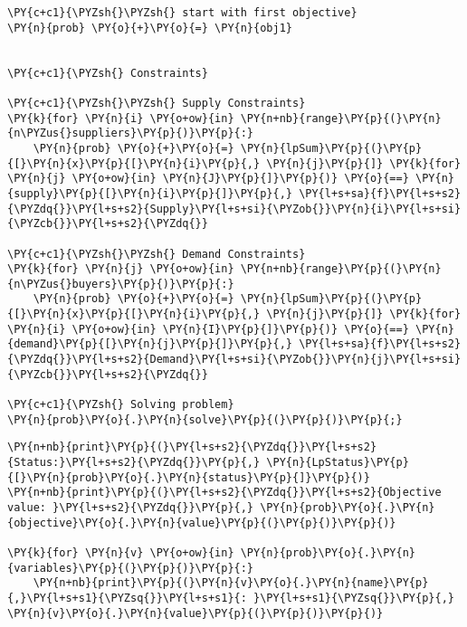 \begin{tcolorbox}[breakable, size=fbox, boxrule=1pt, pad at break*=1mm,colback=cellbackground, colframe=cellborder]
\begin{Verbatim}[commandchars=\\\{\}]
\PY{c+c1}{\PYZsh{}\PYZsh{} start with first objective}
\PY{n}{prob} \PY{o}{+}\PY{o}{=} \PY{n}{obj1}


\PY{c+c1}{\PYZsh{} Constraints}

\PY{c+c1}{\PYZsh{}\PYZsh{} Supply Constraints}
\PY{k}{for} \PY{n}{i} \PY{o+ow}{in} \PY{n+nb}{range}\PY{p}{(}\PY{n}{n\PYZus{}suppliers}\PY{p}{)}\PY{p}{:}
    \PY{n}{prob} \PY{o}{+}\PY{o}{=} \PY{n}{lpSum}\PY{p}{(}\PY{p}{[}\PY{n}{x}\PY{p}{[}\PY{n}{i}\PY{p}{,} \PY{n}{j}\PY{p}{]} \PY{k}{for} \PY{n}{j} \PY{o+ow}{in} \PY{n}{J}\PY{p}{]}\PY{p}{)} \PY{o}{==} \PY{n}{supply}\PY{p}{[}\PY{n}{i}\PY{p}{]}\PY{p}{,} \PY{l+s+sa}{f}\PY{l+s+s2}{\PYZdq{}}\PY{l+s+s2}{Supply}\PY{l+s+si}{\PYZob{}}\PY{n}{i}\PY{l+s+si}{\PYZcb{}}\PY{l+s+s2}{\PYZdq{}}
    
\PY{c+c1}{\PYZsh{}\PYZsh{} Demand Constraints}
\PY{k}{for} \PY{n}{j} \PY{o+ow}{in} \PY{n+nb}{range}\PY{p}{(}\PY{n}{n\PYZus{}buyers}\PY{p}{)}\PY{p}{:}
    \PY{n}{prob} \PY{o}{+}\PY{o}{=} \PY{n}{lpSum}\PY{p}{(}\PY{p}{[}\PY{n}{x}\PY{p}{[}\PY{n}{i}\PY{p}{,} \PY{n}{j}\PY{p}{]} \PY{k}{for} \PY{n}{i} \PY{o+ow}{in} \PY{n}{I}\PY{p}{]}\PY{p}{)} \PY{o}{==} \PY{n}{demand}\PY{p}{[}\PY{n}{j}\PY{p}{]}\PY{p}{,} \PY{l+s+sa}{f}\PY{l+s+s2}{\PYZdq{}}\PY{l+s+s2}{Demand}\PY{l+s+si}{\PYZob{}}\PY{n}{j}\PY{l+s+si}{\PYZcb{}}\PY{l+s+s2}{\PYZdq{}}
    
\PY{c+c1}{\PYZsh{} Solving problem}
\PY{n}{prob}\PY{o}{.}\PY{n}{solve}\PY{p}{(}\PY{p}{)}\PY{p}{;}
\end{Verbatim}
\end{tcolorbox}

    \begin{tcolorbox}[breakable, size=fbox, boxrule=1pt, pad at break*=1mm,colback=cellbackground, colframe=cellborder]
\begin{Verbatim}[commandchars=\\\{\}]
\PY{n+nb}{print}\PY{p}{(}\PY{l+s+s2}{\PYZdq{}}\PY{l+s+s2}{Status:}\PY{l+s+s2}{\PYZdq{}}\PY{p}{,} \PY{n}{LpStatus}\PY{p}{[}\PY{n}{prob}\PY{o}{.}\PY{n}{status}\PY{p}{]}\PY{p}{)}
\PY{n+nb}{print}\PY{p}{(}\PY{l+s+s2}{\PYZdq{}}\PY{l+s+s2}{Objective value: }\PY{l+s+s2}{\PYZdq{}}\PY{p}{,} \PY{n}{prob}\PY{o}{.}\PY{n}{objective}\PY{o}{.}\PY{n}{value}\PY{p}{(}\PY{p}{)}\PY{p}{)}

\PY{k}{for} \PY{n}{v} \PY{o+ow}{in} \PY{n}{prob}\PY{o}{.}\PY{n}{variables}\PY{p}{(}\PY{p}{)}\PY{p}{:}
    \PY{n+nb}{print}\PY{p}{(}\PY{n}{v}\PY{o}{.}\PY{n}{name}\PY{p}{,}\PY{l+s+s1}{\PYZsq{}}\PY{l+s+s1}{: }\PY{l+s+s1}{\PYZsq{}}\PY{p}{,} \PY{n}{v}\PY{o}{.}\PY{n}{value}\PY{p}{(}\PY{p}{)}\PY{p}{)}
\end{Verbatim}
\end{tcolorbox}

